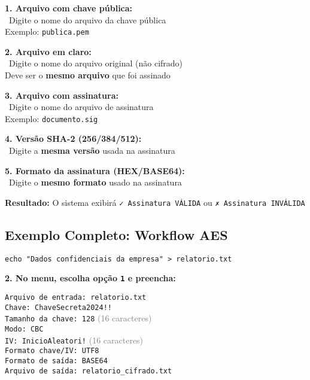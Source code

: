 \documentclass[12pt,a4paper]{article}
\begin{document}
\begin{tcolorbox}[colback=successgreen!10,colframe=successgreen,title={\faCheckCircle\ Campos para Verificação RSA}]

\textbf{1. Arquivo com chave pública:}\\
\quad \faUnlock\ Digite o nome do arquivo da chave pública\\
\quad Exemplo: \texttt{publica.pem}

\textbf{2. Arquivo em claro:}\\
\quad \faFileAlt\ Digite o nome do arquivo original (não cifrado)\\
\quad Deve ser o \textbf{mesmo arquivo} que foi assinado

\textbf{3. Arquivo com assinatura:}\\
\quad \faFileSignature\ Digite o nome do arquivo de assinatura\\
\quad Exemplo: \texttt{documento.sig}

\textbf{4. Versão SHA-2 (256/384/512):}\\
\quad \faHashtag\ Digite a \textbf{mesma versão} usada na assinatura

\textbf{5. Formato da assinatura (HEX/BASE64):}\\
\quad \faFileCode\ Digite o \textbf{mesmo formato} usado na assinatura

\end{tcolorbox}

\textbf{Resultado:} O sistema exibirá \texttt{✓ Assinatura VÁLIDA} ou \texttt{✗ Assinatura INVÁLIDA}

\subsection{Exemplo Completo: Workflow AES}

\begin{lstlisting}[style=bashstyle,caption={1. Preparar arquivo}]
echo "Dados confidenciais da empresa" > relatorio.txt
\end{lstlisting}

\textbf{2. No menu, escolha opção \texttt{1} e preencha:}

\begin{tcolorbox}[colback=codebg,colframe=gray!50]
\footnotesize
\texttt{Arquivo de entrada: relatorio.txt}\\
\texttt{Chave: ChaveSecreta2024!!}\\
\texttt{Tamanho da chave: 128} \textcolor{gray}{(16 caracteres)}\\
\texttt{Modo: CBC}\\
\texttt{IV: InicioAleatori!} \textcolor{gray}{(16 caracteres)}\\
\texttt{Formato chave/IV: UTF8}\\
\texttt{Formato de saída: BASE64}\\
\texttt{Arquivo de saída: relatorio\_cifrado.txt}
\end{tcolorbox}
\end{document}
